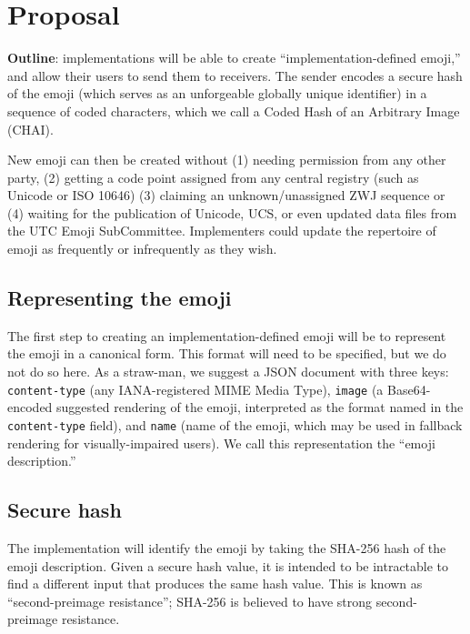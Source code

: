 \documentclass[12pt]{article}
\begin{document}
\section{Proposal}

\textbf{Outline}: implementations will be able to create
``implementation-defined emoji,'' and allow their users to send them
to receivers. The sender encodes a secure hash of the emoji (which
serves as an unforgeable globally unique identifier) in a sequence of
coded characters, which we call a Coded Hash of an Arbitrary Image
(CHAI).

New emoji can then be created without (1) needing permission from any other party,
(2) getting a code point assigned from any central registry (such as Unicode or ISO 10646)
(3) claiming an unknown/unassigned ZWJ sequence or (4) waiting for the publication of Unicode, UCS,
or even updated data files from the UTC Emoji SubCommittee.  Implementers could update the repertoire 
of emoji as frequently or infrequently as they wish.


\subsection{Representing the emoji}

The first step to creating an implementation-defined emoji will be to
represent the emoji in a canonical form. This format will need to be
specified, but we do not do so here. As a straw-man, we suggest a JSON
document with three keys: \texttt{content-type} (any IANA-registered MIME
Media Type), \texttt{image} (a Base64-encoded suggested rendering of the emoji,
interpreted as the format named in the \texttt{content-type} field), and
\texttt{name} (name of the emoji, which may be used in fallback
rendering for visually-impaired users). We call this representation
the ``emoji description.''

\subsection{Secure hash}

The implementation will identify the emoji by taking the SHA-256 hash
of the emoji description. Given a secure hash value, it is intended to be
intractable to find a different input that produces the same
hash value. This is known as ``second-preimage resistance'';
SHA-256 is believed to have strong second-preimage resistance.
\end{document}
